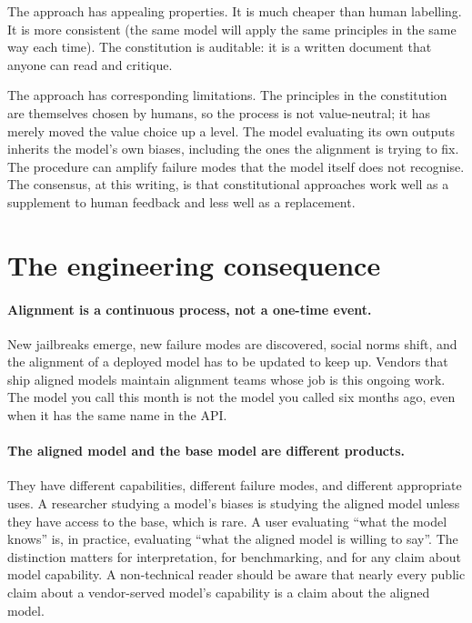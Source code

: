 The approach has appealing properties. It is much cheaper than
human labelling. It is more consistent (the same model will
apply the same principles in the same way each time). The
constitution is auditable: it is a written document that anyone
can read and critique.

The approach has corresponding limitations. The principles in
the constitution are themselves chosen by humans, so the
process is not value-neutral; it has merely moved the value
choice up a level. The model evaluating its own outputs
inherits the model's own biases, including the ones the
alignment is trying to fix. The procedure can amplify failure
modes that the model itself does not recognise. The
consensus, at this writing, is that constitutional approaches
work well as a supplement to human feedback and less well as a
replacement.

\section{The engineering consequence}

\paragraph{Alignment is a continuous process, not a one-time
event.} New jailbreaks emerge, new failure modes are
discovered, social norms shift, and the alignment of a
deployed model has to be updated to keep up. Vendors that ship
aligned models maintain alignment teams whose job is this
ongoing work. The model you call this month is not the model
you called six months ago, even when it has the same name in
the API.

\paragraph{The aligned model and the base model are different
products.} They have different capabilities, different failure
modes, and different appropriate uses. A researcher studying a
model's biases is studying the aligned model unless they have
access to the base, which is rare. A user evaluating ``what the
model knows'' is, in practice, evaluating ``what the aligned
model is willing to say''. The distinction matters for
interpretation, for benchmarking, and for any claim about
model capability. A non-technical reader should be aware that
nearly every public claim about a vendor-served model's
capability is a claim about the aligned model.

